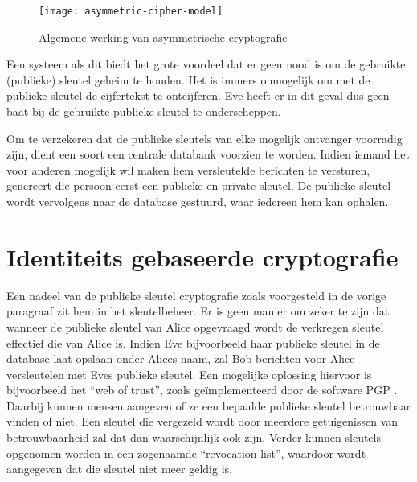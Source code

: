 \begin{figure}[h]
	\centering
		 \texttt{[image: asymmetric-cipher-model]}
		 \caption{Algemene werking van asymmetrische cryptografie\label{fig-encryptie-applicaties-asym-cipher}}
\end{figure}

Een systeem als dit biedt het grote voordeel dat er geen nood is om de gebruikte (publieke) sleutel geheim te houden. Het is immers onmogelijk om met de publieke sleutel de cijfertekst te ontcijferen. Eve heeft er in dit geval dus geen baat bij de gebruikte publieke sleutel te onderscheppen. 

Om te verzekeren dat de publieke sleutels van elke mogelijk ontvanger voorradig zijn, dient een soort een centrale databank voorzien te worden. Indien iemand het voor anderen mogelijk wil maken hem versleutelde berichten te versturen, genereert die persoon eerst een publieke en private sleutel. De publieke sleutel wordt vervolgens naar de database gestuurd, waar iedereen hem kan ophalen.




\section{Identiteits gebaseerde cryptografie}

Een nadeel van de publieke sleutel cryptografie zoals voorgesteld in de vorige paragraaf zit hem in het sleutelbeheer. Er is geen manier om zeker te zijn dat wanneer de publieke sleutel van Alice opgevraagd wordt de verkregen sleutel effectief die van Alice is. Indien Eve bijvoorbeeld haar publieke sleutel in de database laat opslaan onder Alices naam, zal Bob berichten voor Alice versleutelen met Eves publieke sleutel. Een mogelijke oplossing hiervoor is bijvoorbeeld het ``web of trust'', zoals ge\"implementeerd door de software PGP \cite{pgp}. Daarbij kunnen mensen aangeven of ze een bepaalde publieke sleutel betrouwbaar vinden of niet. Een sleutel die vergezeld wordt door meerdere getuigenissen van betrouwbaarheid zal dat dan waarschijnlijk ook zijn. Verder kunnen sleutels opgenomen worden in een zogenaamde ``revocation list'', waardoor wordt aangegeven dat die sleutel niet meer geldig is.

